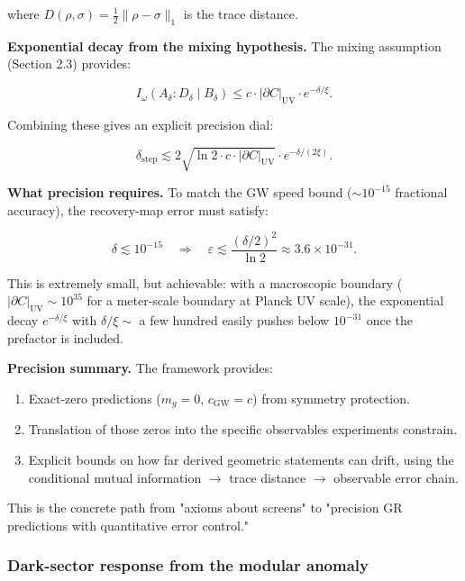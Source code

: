 where \(D(\rho, \sigma) = \frac{1}{2}\|\rho - \sigma\|_1\) is the trace distance.

\textbf{Exponential decay from the mixing hypothesis.} The mixing assumption (Section 2.3) provides:

\[
I_\omega(A_\delta : D_\delta \mid B_\delta)
\le c \cdot |\partial C|_{\mathrm{UV}} \cdot e^{-\delta/\xi}.
\]

Combining these gives an explicit precision dial:

\[
\delta_{\mathrm{step}} \lesssim 2\sqrt{\ln 2 \cdot c \cdot |\partial C|_{\mathrm{UV}}}
\cdot e^{-\delta/(2\xi)}.
\]

\textbf{What precision requires.} To match the GW speed bound (\(\sim 10^{-15}\) fractional accuracy), the recovery-map error must satisfy:

\[
\delta \lesssim 10^{-15}
\quad \Rightarrow \quad
\varepsilon \lesssim \frac{(\delta/2)^2}{\ln 2} \approx 3.6 \times 10^{-31}.
\]

This is extremely small, but achievable: with a macroscopic boundary (\(|\partial C|_{\mathrm{UV}} \sim 10^{35}\) for a meter-scale boundary at Planck UV scale), the exponential decay \(e^{-\delta/\xi}\) with \(\delta/\xi \sim\) a few hundred easily pushes below \(10^{-31}\) once the prefactor is included.

\textbf{Precision summary.} The framework provides:

\begin{enumerate}
\def\labelenumi{\arabic{enumi}.}
\tightlist
\item
  Exact-zero predictions (\(m_g = 0\), \(c_{\mathrm{GW}} = c\)) from symmetry protection.
\item
  Translation of those zeros into the specific observables experiments constrain.
\item
  Explicit bounds on how far derived geometric statements can drift, using the conditional mutual information \ensuremath{\to} trace distance \ensuremath{\to} observable error chain.
\end{enumerate}

This is the concrete path from "axioms about screens" to "precision GR predictions with quantitative error control."

\subsubsection{Dark-sector response from the modular anomaly}\label{515-dark-matter-as-modular-anomaly}

